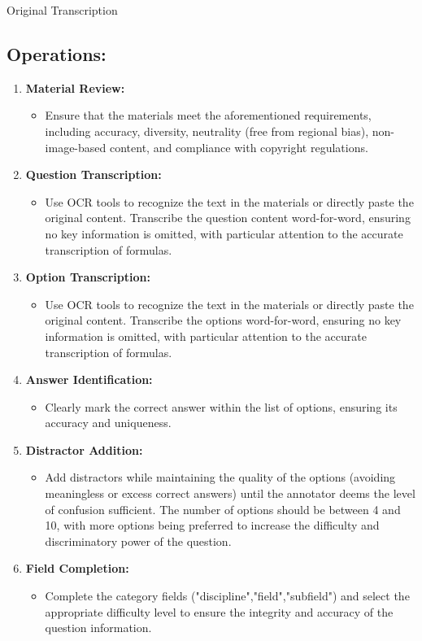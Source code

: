\begin{methodbox}{Original Transcription}
\subsection*{Operations:}
\begin{enumerate}
    \item \textbf{Material Review:}
    \begin{itemize}
        \item Ensure that the materials meet the aforementioned requirements, including accuracy, diversity, neutrality (free from regional bias), non-image-based content, and compliance with copyright regulations.
    \end{itemize}
    \item \textbf{Question Transcription:}
    \begin{itemize}
        \item Use OCR tools to recognize the text in the materials or directly paste the original content. Transcribe the question content word-for-word, ensuring no key information is omitted, with particular attention to the accurate transcription of formulas.
    \end{itemize}
    \item \textbf{Option Transcription:}
    \begin{itemize}
        \item Use OCR tools to recognize the text in the materials or directly paste the original content. Transcribe the options word-for-word, ensuring no key information is omitted, with particular attention to the accurate transcription of formulas.
    \end{itemize}
    \item \textbf{Answer Identification:}
    \begin{itemize}
        \item Clearly mark the correct answer within the list of options, ensuring its accuracy and uniqueness.
    \end{itemize}
    \item \textbf{Distractor Addition:}
    \begin{itemize}
        \item Add distractors while maintaining the quality of the options (avoiding meaningless or excess correct answers) until the annotator deems the level of confusion sufficient. The number of options should be between 4 and 10, with more options being preferred to increase the difficulty and discriminatory power of the question.
    \end{itemize}
    \item \textbf{Field Completion:}
    \begin{itemize}
        \item Complete the category fields ("discipline","field","subfield") and select the appropriate difficulty level to ensure the integrity and accuracy of the question information.
    \end{itemize}
\end{enumerate}
\end{methodbox}

